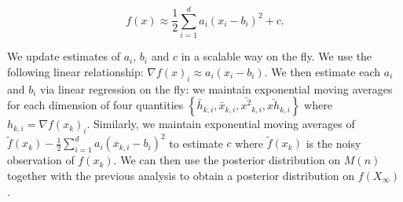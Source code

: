 \documentclass[12pt,english]{article}
\newcommand{\stedit}[1]{{\color{blue} #1}}
\begin{document}
\[
f\left(x\right)\approx \frac{1}{2}\sum_{i=1}^{d}a_{i}\left(x_{i}-b_{i}\right)^{2}+c.
\]

We update estimates of $a_{i}$, $b_{i}$ and $c$ in a scalable way on the fly. We use the following linear relationship: $\nabla f\left(x\right)_{i}\approx a_{i}(x_{i}-b_{i})$. We then estimate each $a_{i}$ and $b_{i}$ via linear regression on the fly: we maintain exponential moving averages for each dimension of four quantities $\left\{ \bar{h}_{k,i},\bar{x}_{k,i},\bar{x^{2}}_{k,i},\bar{xh}_{k,i}\right\} $ where
$h_{k,i}=\nabla f\left(x_{k}\right)_{i}$. Similarly, we maintain exponential moving averages of $\tilde{f}\left(x_{k}\right)-\frac{1}{2}\sum_{i=1}^{d}a_{i}\left(x_{k,i}-b_{i}\right)^{2}$ to estimate $c$ where $\tilde{f}\left(x_{k}\right)$ is the noisy observation of $f(x_{k})$. \stedit{We can then use the posterior distribution on $M(n)$ together with the previous analysis to obtain a posterior distribution on $f(X_\infty)$.}


\end{document}
